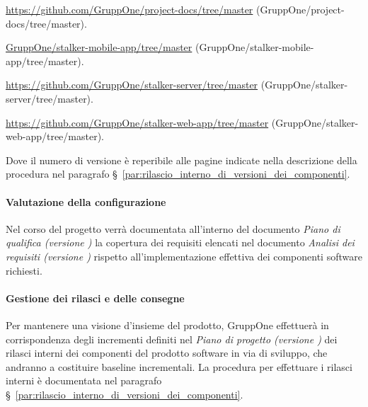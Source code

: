 \documentclass[../../norme-di-progetto.tex]{subfiles}
\begin{document}
\begin{description}
  \item \href{https://github.com/GruppOne/project-docs/tree/master}{https://github.com/GruppOne/project-docs/tree/master} (GruppOne/project-docs/tree/master).
  \item \href{https://github.com/GruppOne/stalker-mobile-app/tree/master}{GruppOne/stalker-mobile-app/tree/master} (GruppOne/stalker-mobile-app/tree/master).
  \item \href{https://github.com/GruppOne/stalker-server/tree/master}{https://github.com/GruppOne/stalker-server/tree/master} (GruppOne/stalker-server/tree/master).
  \item \href{https://github.com/GruppOne/stalker-web-app/tree/master}{https://github.com/GruppOne/stalker-web-app/tree/master} (GruppOne/stalker-web-app/tree/master).
\end{description}

Dove il numero di versione è reperibile alle pagine indicate nella descrizione della procedura nel paragrafo §~\ref{par:rilascio_interno_di_versioni_dei_componenti}.


\paragraph{Valutazione della configurazione}%
\label{par:valutazione_della_configurazione}

Nel corso del progetto verrà documentata all'interno del documento \textit{Piano di qualifica (versione \versione)} la copertura dei requisiti elencati nel documento \textit{Analisi dei requisiti (versione \versione)} rispetto all'implementazione effettiva dei componenti software richiesti.


\paragraph{Gestione dei rilasci e delle consegne}%
\label{par:gestione_dei_rilasci_e_delle_consegne}

Per mantenere una visione d'insieme del prodotto, GruppOne effettuerà in corrispondenza degli incrementi definiti nel \textit{Piano di progetto (versione \versione)} dei rilasci interni dei componenti del prodotto software in via di sviluppo, che andranno a costituire baseline incrementali. La procedura per effettuare i rilasci interni è documentata nel paragrafo §~\ref{par:rilascio_interno_di_versioni_dei_componenti}.
\end{document}
